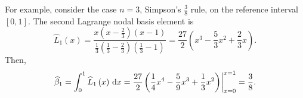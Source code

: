 \begin{frame}
\begin{example}[Newton-Cotes quadrature rules of order $n=1,2$ and weight function $w\equiv 1$ on $\interval$]
		For example, consider the case $n=3$, Simpson's $\frac{3}{8}$
		rule, on the reference interval $\left[0,1\right]$.
		The second Lagrange nodal basis element is
		\begin{equation*}
			\widehat{L}_{1}\left(x\right)=
			\dfrac{
				x
				\left(x-\frac{2}{3}\right)
				\left(x-1\right)
			}{
				\frac{1}{3}
				\left(\frac{1}{3}-\frac{2}{3}\right)
				\left(\frac{1}{3}-1\right)
			}=
			\dfrac{27}{2}
			\left(
			x^{3}-\dfrac{5}{3}x^{2}+\dfrac{2}{3}x
			\right).
		\end{equation*}
		Then,
		\begin{equation*}
			\widehat{\beta}_{1}=
			\int_{0}^{1}
			\widehat{L}_{1}\left(x\right)
			\dl x=
			\dfrac{27}{2}
			{\left.
				\left(
				\dfrac{1}{4}x^{4}-
				\dfrac{5}{9}x^{3}+
				\dfrac{1}{3}x^{2}
				\right)
				\right|}_{x=0}^{x=1}=
			\dfrac{3}{8}.
		\end{equation*}
	\end{example}
\end{frame}

